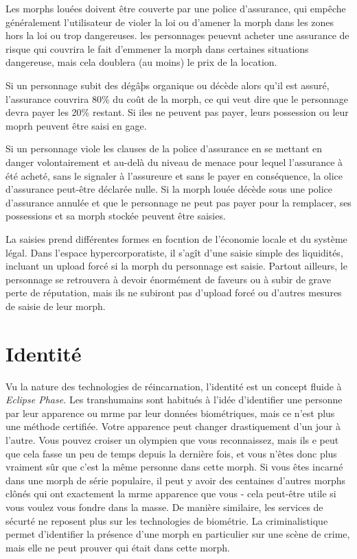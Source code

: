 Les morphs louées doivent être couverte par une police d'assurance, qui empêche généralement l'utilisateur de violer la loi ou d'amener la morph dans les zones hors la loi ou trop dangereuses. les personnages peuevnt acheter une assurance de risque qui couvrira le fait d'emmener la morph dans certaines situations dangereuse, mais cela doublera (au moins) le prix de la location. 



Si un personnage subit des dégâþs organique ou décède alors qu'il est assuré, l'assurance couvrira 80\% du coût de la morph, ce qui veut dire que le personnage devra payer les 20\% restant. Si iles ne peuvent pas payer, leurs possession ou leur moprh peuvent être saisi en gage. 

Si un personnage viole les clauses de la police d'assurance en se mettant en danger volontairement et au-delà du niveau de menace pour lequel l'assurance à été acheté, sans le signaler à l'assureure et sans le payer en conséquence, la olice d'assurance peut-être déclarée nulle. Si la morph louée décède sous une police d'assurance annulée et que le personnage ne peut pas payer pour la remplacer, ses possessions et sa morph stockée peuvent être saisies. 

La saisies prend différentes formes en focntion de l'économie locale et du système légal. Dans l'espace hypercorporatiste, il s'agît d'une saisie simple des liquidités, incluant un upload forcé si la morph du personnage est saisie. Partout ailleurs, le personnage se retrouvera à devoir énormément de faveurs ou à subir de grave perte de réputation, mais ils ne subiront pas d'upload forcé ou d'autres mesures de saisie de leur morph. 

\section{Identité} 

Vu la nature des technologies de réincarnation, l'identité est un concept fluide à \textit{Eclipse Phase.} Les transhumains sont habitués à l'idée d'identifier une personne par leur apparence ou mrme par leur données biométriques, mais ce n'est plus une méthode certifiée. Votre apparence peut changer drastiquement d'un jour à l'autre. Vous pouvez croiser un olympien que vous reconnaissez, mais ils e peut que cela fasse un peu de temps depuis la dernière fois, et vous n'êtes donc plus vraiment sûr que c'est la même personne dans cette morph. Si vous êtes incarné dans une morph de série populaire, il peut y avoir des centaines d'autres morphs clônés qui ont exactement la mrme apparence que vous - cela peut-être utile si vous voulez vous fondre dans la masse. De manière similaire, les services de sécurté ne reposent plus sur les technologies de biométrie. La criminalistique permet d'identifier la présence d'une morph en particulier sur une scène de crime, mais elle ne peut prouver qui était dans cette morph. 

